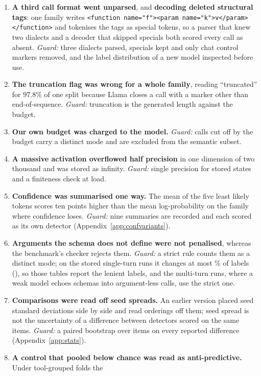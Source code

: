 \begin{enumerate}[topsep=2pt,itemsep=2pt,leftmargin=1.4em]
\emph{Guard:} group splits by tool and keep the tool-identity classifier in the confound panel.
\item \textbf{A third call format went unparsed}, and \textbf{decoding deleted structural tags}: one family
writes \texttt{<function name="f"><param name="k">v</param></function>} and tokenises the tags as special
tokens, so a parser that knew two dialects and a decoder that skipped specials both scored every call as
absent. \emph{Guard:} three dialects parsed, specials kept and only chat control markers removed, and the
label distribution of a new model inspected before use.
\item \textbf{The truncation flag was wrong for a whole family}, reading ``truncated'' for $97.8\%$ of one
split because Llama closes a call with a marker other than end-of-sequence. \emph{Guard:} truncation is the
generated length against the budget.
\item \textbf{Our own budget was charged to the model.} \emph{Guard:} calls cut off by the budget carry a
distinct mode and are excluded from the semantic subset.
\item \textbf{A massive activation overflowed half precision} in one dimension of two thousand and was stored
as infinity. \emph{Guard:} single precision for stored states and a finiteness check at load.
\item \textbf{Confidence was summarised one way.} The mean of the five least likely tokens scores ten points
higher than the mean log-probability on the family where confidence loses. \emph{Guard:} nine summaries are
recorded and each scored as its own detector (Appendix~\ref{app:confvariants}).
\item \textbf{Arguments the schema does not define were not penalised}, whereas the benchmark's checker
rejects them. \emph{Guard:} a strict rule counts them as a distinct mode; on the stored single-turn runs it
changes at most \extraFlipsMaxPct{}\% of labels (\extraFlipsMaxRun{}), so those tables report the lenient
labels, and the multi-turn runs, where a weak model echoes schemas into argument-less calls, use the strict
one.
\item \textbf{Comparisons were read off seed spreads.} An earlier version placed seed standard deviations side
by side and read orderings off them; seed spread is not the uncertainty of a difference between detectors
scored on the same items. \emph{Guard:} a paired bootstrap over items on every reported difference
(Appendix~\ref{app:stats}).
\item \textbf{A control that pooled below chance was read as anti-predictive.} Under tool-grouped folds the

\end{enumerate}

